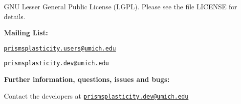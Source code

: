 G\-N\-U Lesser General Public License (L\-G\-P\-L). Please see the file L\-I\-C\-E\-N\-S\-E for details.

{\bfseries Mailing List\-:}


\begin{DoxyItemize}
\item \href{mailto:prismsplasticity.users@umich.edu}{\tt prismsplasticity.\-users@umich.\-edu}
\item \href{mailto:prismsplasticity.dev@umich.edu}{\tt prismsplasticity.\-dev@umich.\-edu}
\end{DoxyItemize}

{\bfseries Further information, questions, issues and bugs\-:}

Contact the developers at \href{mailto:prismsplasticity.dev@umich.edu}{\tt prismsplasticity.\-dev@umich.\-edu} 